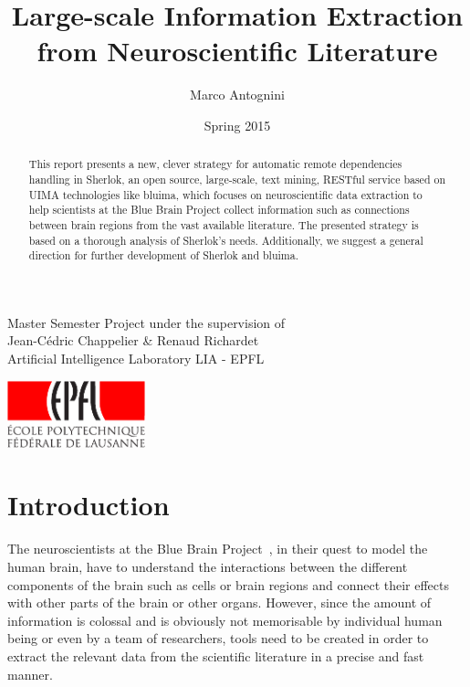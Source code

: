 \documentclass{article}
\title{Large-scale Information Extraction from Neuroscientific Literature}
\date{Spring 2015}
\author{Marco Antognini}
\begin{document}
\maketitle

\begin{center}
    Master Semester Project under the supervision of\\
    Jean-Cédric Chappelier \& Renaud Richardet\\
    Artificial Intelligence Laboratory LIA - EPFL
\end{center}

\vfill

\begin{abstract}

    This report presents a new, clever strategy for automatic remote dependencies handling in
    Sherlok, an open source, large-scale, text mining, RESTful service based on UIMA technologies
    like bluima, which focuses on neuroscientific data extraction to help scientists at the Blue
    Brain Project collect information such as connections between brain regions from the vast
    available literature. The presented strategy is based on a thorough analysis of Sherlok's needs.
    Additionally, we suggest a general direction for further development of Sherlok and bluima.

\end{abstract}

\vfill

\begin{center}
    \includegraphics[width = 40mm]{res/epfl-logo}
\end{center}

\newpage
{}


\tableofcontents

\section{Introduction}

The neuroscientists at the Blue Brain Project~\cite{bbp}, in their quest to model the human brain,
have to understand the interactions between the different components of the brain such as cells or
brain regions and connect their effects with other parts of the brain or other organs. However,
since the amount of information is colossal and is obviously not memorisable by individual human
being or even by a team of researchers, tools need to be created in order to extract the relevant
data from the scientific literature in a precise and fast manner.
\end{document}
